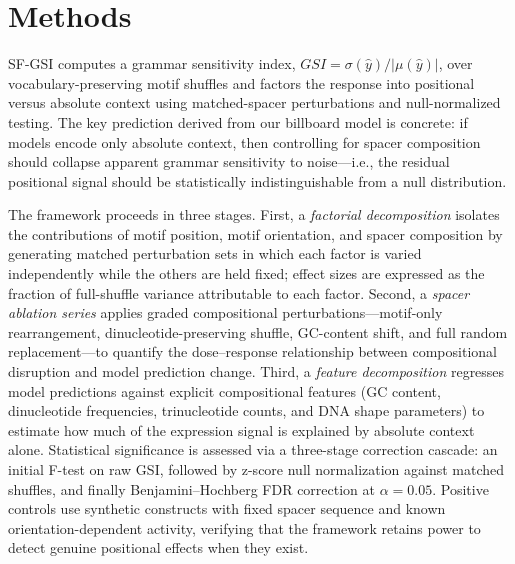 \documentclass[10pt]{article}
\begin{document}
\section*{Methods}

SF-GSI computes a grammar sensitivity index, $GSI = \sigma(\hat{y}) / |\mu(\hat{y})|$, over vocabulary-preserving motif shuffles and factors the response into positional versus absolute context using matched-spacer perturbations and null-normalized testing.
The key prediction derived from our billboard model is concrete: if models encode only absolute context, then controlling for spacer composition should collapse apparent grammar sensitivity to noise---i.e., the residual positional signal should be statistically indistinguishable from a null distribution.

The framework proceeds in three stages.
First, a \textit{factorial decomposition} isolates the contributions of motif position, motif orientation, and spacer composition by generating matched perturbation sets in which each factor is varied independently while the others are held fixed; effect sizes are expressed as the fraction of full-shuffle variance attributable to each factor.
Second, a \textit{spacer ablation series} applies graded compositional perturbations---motif-only rearrangement, dinucleotide-preserving shuffle, GC-content shift, and full random replacement---to quantify the dose--response relationship between compositional disruption and model prediction change.
Third, a \textit{feature decomposition} regresses model predictions against explicit compositional features (GC content, dinucleotide frequencies, trinucleotide counts, and DNA shape parameters) to estimate how much of the expression signal is explained by absolute context alone.
Statistical significance is assessed via a three-stage correction cascade: an initial F-test on raw GSI, followed by z-score null normalization against matched shuffles, and finally Benjamini--Hochberg FDR correction at $\alpha = 0.05$.
Positive controls use synthetic constructs with fixed spacer sequence and known orientation-dependent activity, verifying that the framework retains power to detect genuine positional effects when they exist.
\end{document}
